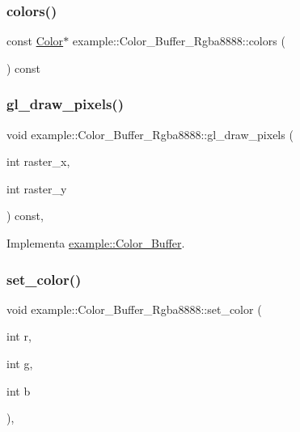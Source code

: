 \subsubsection{\texorpdfstring{colors()}{colors()}\hspace{0.1cm}{\footnotesize\ttfamily [2/2]}}
{\footnotesize\ttfamily const \mbox{\hyperlink{structexample_1_1_color___buffer___rgba8888_1_1_color}{Color}}$\ast$ example\+::\+Color\+\_\+\+Buffer\+\_\+\+Rgba8888\+::colors (\begin{DoxyParamCaption}{ }\end{DoxyParamCaption}) const\hspace{0.3cm}{\ttfamily [inline]}}

\mbox{\label{classexample_1_1_color___buffer___rgba8888_a66e133b6fd196f02a0ba454dd3fc550f}} 
\subsubsection{\texorpdfstring{gl\_draw\_pixels()}{gl\_draw\_pixels()}}
{\footnotesize\ttfamily void example\+::\+Color\+\_\+\+Buffer\+\_\+\+Rgba8888\+::gl\+\_\+draw\+\_\+pixels (\begin{DoxyParamCaption}\item[{int}]{raster\+\_\+x,  }\item[{int}]{raster\+\_\+y }\end{DoxyParamCaption}) const\hspace{0.3cm}{\ttfamily [inline]}, {\ttfamily [virtual]}}



Implementa \mbox{\hyperlink{classexample_1_1_color___buffer_a793b667028b2eb7efde2cee76066eac7}{example\+::\+Color\+\_\+\+Buffer}}.

\mbox{\label{classexample_1_1_color___buffer___rgba8888_a408bf6adf54fc9958b74d21c8f6da178}} 
\subsubsection{\texorpdfstring{set\_color()}{set\_color()}\hspace{0.1cm}{\footnotesize\ttfamily [1/2]}}
{\footnotesize\ttfamily void example\+::\+Color\+\_\+\+Buffer\+\_\+\+Rgba8888\+::set\+\_\+color (\begin{DoxyParamCaption}\item[{int}]{r,  }\item[{int}]{g,  }\item[{int}]{b }\end{DoxyParamCaption})\hspace{0.3cm}{\ttfamily [inline]}, {\ttfamily [virtual]}}



